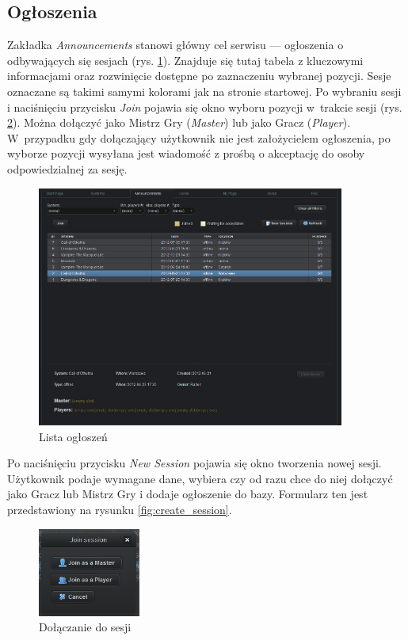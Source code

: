\subsection{Ogłoszenia}
\label{sec:sessions}
Zakładka \emph{Announcements} stanowi główny cel serwisu --- ogłoszenia o odbywających się sesjach (rys. \ref{fig:sessions}).  Znajduje się tutaj tabela z kluczowymi informacjami oraz rozwinięcie dostępne po zaznaczeniu wybranej pozycji. Sesje oznaczane są takimi samymi kolorami jak na stronie startowej. Po wybraniu sesji i naciśnięciu przycisku \emph{Join} pojawia się okno wyboru pozycji w~trakcie sesji (rys. \ref{fig:join_session}). Można dołączyć jako Mistrz Gry (\emph{Master}) lub jako Gracz (\emph{Player}). W~przypadku gdy dołączający użytkownik nie jest założycielem ogłoszenia, po wyborze pozycji wysyłana jest wiadomość z prośbą o akceptację do osoby odpowiedzialnej za sesję. 
\clearpage
\begin{figure}[h!]
\centering
\includegraphics[width=0.9\textwidth]{./img/interfejsy/sessions}
\caption{Lista ogłoszeń}
\label{fig:sessions}
\end{figure}

Po naciśnięciu przycisku \emph{New Session} pojawia się okno tworzenia nowej sesji. Użytkownik podaje wymagane dane, wybiera czy od razu chce do niej dołączyć jako Gracz lub Mistrz Gry i dodaje ogłoszenie do bazy. Formularz ten jest przedstawiony na rysunku \ref{fig:create_session}.

\begin{figure}[h!]
\centering
\includegraphics[width=0.3\textwidth]{./img/interfejsy/join_session}
\caption{Dołączanie do sesji}
\label{fig:join_session}
\end{figure}

